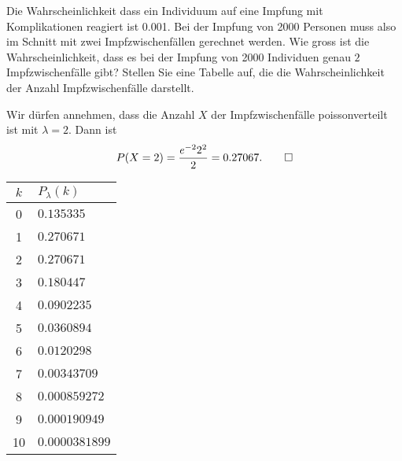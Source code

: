 Die Wahrscheinlichkeit dass ein Individuum auf eine Impfung
mit Komplikationen reagiert ist 0.001.
Bei der Impfung von 2000 Personen muss also im Schnitt
mit zwei Impfzwischenfällen gerechnet werden.
Wie gross ist die Wahrscheinlichkeit, dass es
bei der Impfung von 2000 Individuen genau $2$ Impfzwischenfälle
gibt? Stellen Sie eine Tabelle auf, die die Wahrscheinlichkeit
der Anzahl Impfzwischenfälle darstellt.

\begin{loesung}
Wir dürfen annehmen, dass die Anzahl $X$ der Impfzwischenfälle
poissonverteilt ist mit $\lambda=2$. Dann ist
\[
P(X=2)=\frac{e^{-2}2^2}2=0.27067.
\qedhere
\]
\begin{center}
\begin{tabular}{|c|l|}
\hline
$k$&$P_\lambda(k)$\\
\hline
0&$0.135335$\\
1&$0.270671$\\
2&$0.270671$\\
3&$0.180447$\\
4&$0.0902235$\\
5&$0.0360894$\\
6&$0.0120298$\\
7&$0.00343709$\\
8&$0.000859272$\\
9&$0.000190949$\\
10&$0.0000381899$\\
\hline
\end{tabular}
\end{center}
\end{loesung}
